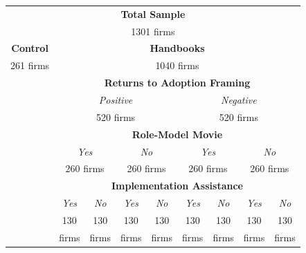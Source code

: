 \documentclass[11.5pt]{article}
\begin{document}
\begin{appendices}
\begin{table}[h!]
  \centering
  \renewcommand{\arraystretch}{1.4}
  \begin{tabular}{|c|c|c|c|c|c|c|c|c|}
    \hline
    \multicolumn{9}{|c|}{\textbf{Total Sample}}\\
    \multicolumn{9}{|c|}{1301 firms}\\
    \hline
    \multicolumn{1}{|c}{\textbf{Control}} & \multicolumn{8}{|c|}{\textbf{Handbooks}}\\
    \multicolumn{1}{|c}{261 firms} & \multicolumn{8}{|c|}{1040 firms}\\
    \cline{2-9}
    \multicolumn{1}{|c}{} & \multicolumn{8}{|c|}{\textbf{Returns to Adoption Framing}}\\
    \cline{2-9}
    \multicolumn{1}{|c}{} & \multicolumn{4}{|c}{\textit{Positive}} & \multicolumn{4}{|c|}{\textit{Negative}}\\
    \multicolumn{1}{|c}{} & \multicolumn{4}{|c}{520 firms} & \multicolumn{4}{|c|}{520 firms}\\
    \cline{2-9}
    \multicolumn{1}{|c}{} & \multicolumn{8}{|c|}{\textbf{Role-Model Movie}}\\
    \cline{2-9}
    \multicolumn{1}{|c}{} & \multicolumn{2}{|c}{\textit{Yes}} & \multicolumn{2}{|c}{\textit{No}} & \multicolumn{2}{|c}{\textit{Yes}} & \multicolumn{2}{|c|}{\textit{No}}\\
    \multicolumn{1}{|c}{} & \multicolumn{2}{|c}{260 firms} & \multicolumn{2}{|c}{260 firms} & \multicolumn{2}{|c}{260 firms} & \multicolumn{2}{|c|}{260 firms}\\
    \cline{2-9}
    \multicolumn{1}{|c}{} & \multicolumn{8}{|c|}{\textbf{Implementation Assistance}}\\
    \cline{2-9}
    \multicolumn{1}{|c}{} & \multicolumn{1}{|c}{\textit{Yes}} & \multicolumn{1}{|c}{\textit{No}} & \multicolumn{1}{|c}{\textit{Yes}} & \multicolumn{1}{|c}{\textit{No}} & \multicolumn{1}{|c}{\textit{Yes}} & \multicolumn{1}{|c}{\textit{No}} & \multicolumn{1}{|c}{\textit{Yes}} & \multicolumn{1}{|c|}{\textit{No}}\\
	\multicolumn{1}{|c}{} & \multicolumn{1}{|c}{130} & \multicolumn{1}{|c}{130} & \multicolumn{1}{|c}{130} & \multicolumn{1}{|c}{130} & \multicolumn{1}{|c}{130} & \multicolumn{1}{|c}{130} & \multicolumn{1}{|c}{130} & \multicolumn{1}{|c|}{130}\\
	\multicolumn{1}{|c}{} & \multicolumn{1}{|c}{firms} & \multicolumn{1}{|c}{firms} & \multicolumn{1}{|c}{firms} & \multicolumn{1}{|c}{firms} & \multicolumn{1}{|c}{firms} & \multicolumn{1}{|c}{firms} & \multicolumn{1}{|c}{firms} & \multicolumn{1}{|c|}{firms}\\
	\hline
  \end{tabular}
\end{table}




\end{appendices}
\end{document}

